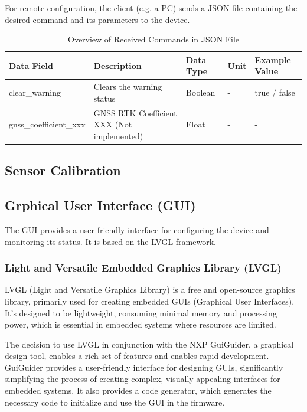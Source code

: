 For remote configuration, the client (e.g. a PC) sends a JSON file containing the desired command and its parameters to the device.

\begin{table}[h]
	\tiny
	\centering
	\begin{tabular}{|l|l|l|l|l|}
		\hline
		\textbf{Data Field}    & \textbf{Description}                       & \textbf{Data Type} & \textbf{Unit} & \textbf{Example Value} \\ \hline
		clear\_warning         & Clears the warning status                  & Boolean            & -             & true / false           \\ \hline
		gnss\_coefficient\_xxx & GNSS RTK Coefficient XXX (Not implemented) & Float              & -             & -                      \\ \hline
	\end{tabular}
	\caption{Overview of Received Commands in JSON File}
	\label{tab:received_commands}
\end{table}

\subsection{Sensor Calibration}



\subsection{Grphical User Interface (GUI)}
The GUI provides a user-friendly interface for configuring the device and monitoring its status.
It is based on the LVGL framework.

\subsubsection{Light and Versatile Embedded Graphics Library (LVGL)}
LVGL (Light and Versatile Graphics Library) is a free and open-source graphics library, primarily used for creating embedded GUIs (Graphical User Interfaces).
It's designed to be lightweight, consuming minimal memory and processing power, which is essential in embedded systems where resources are limited.

The decision to use LVGL in conjunction with the NXP GuiGuider, a graphical design tool, enables a rich set of features and enables rapid development.
GuiGuider provides a user-friendly interface for designing GUIs, significantly simplifying the process of creating complex, visually appealing interfaces for embedded systems.
It also provides a code generator, which generates the necessary code to initialize and use the GUI in the firmware.

